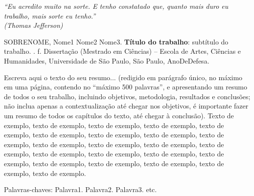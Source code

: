 \documentclass[
	12pt,				%
	oneside,			%
	a4paper,			%
	english,			%
	brazil				%
	]{abntex2ppgsi}
\begin{document}
%
% 
\begin{epigrafe}
    \vspace*{\fill}
	\begin{flushright}
		\textit{``Eu acredito muito na sorte. E tenho constatado que, quanto mais duro eu trabalho, mais sorte eu tenho.''\\
		(Thomas Jefferson)}
	\end{flushright}
\end{epigrafe}


\setlength{\absparsep}{18pt} %
\begin{resumo}

% 
%
% 
%
\begin{flushleft}
SOBRENOME, Nome1 Nome2 Nome3. \textbf{Título do trabalho}: subtítulo do trabalho. \imprimirdata. \pageref{LastPage} f. Dissertação (Mestrado em Ciências) – Escola de Artes, Ciências e Humanidades, Universidade de São Paulo, São Paulo, AnoDeDefesa.
\end{flushleft}

Escreva aqui o texto do seu resumo... (redigido em parágrafo único, no máximo em uma página, contendo no ``máximo 500 palavras'', e apresentando um resumo de todos o seu trabalho, incluindo objetivos, metodologia, resultados e conclusões; não inclua apenas a contextualização até chegar nos objetivos, é importante fazer um resumo de todos os capítulos do texto, até chegar à conclusão). Texto de exemplo, texto de exemplo, texto de exemplo, texto de exemplo, texto de exemplo, texto de exemplo, texto de exemplo, texto de exemplo, texto de exemplo, texto de exemplo, texto de exemplo, texto de exemplo, texto de exemplo, texto de exemplo, texto de exemplo, texto de exemplo, texto de exemplo, texto de exemplo, texto de exemplo, texto de exemplo, texto de exemplo, texto de exemplo.

Palavras-chaves: Palavra1. Palavra2. Palavra3. etc.
\end{resumo}
\end{document}
